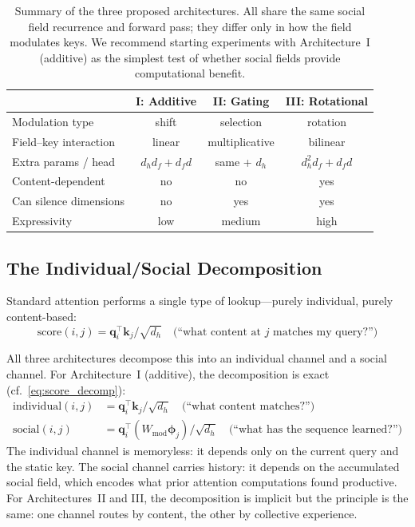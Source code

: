 \documentclass[11pt,a4paper]{article}
\newcommand{\field}{\bm{\phi}}
\newcommand{\q}{\bm{q}}
\newcommand{\K}{\bm{k}}
\begin{document}
\begin{table}[h]
\centering
\small
\begin{tabular}{@{}lccc@{}}
\toprule
& \textbf{I: Additive} & \textbf{II: Gating}
& \textbf{III: Rotational} \\
\midrule
Modulation type & shift & selection & rotation \\
Field--key interaction & linear & multiplicative & bilinear \\
Extra params / head & $d_h d_f + d_f d$ & same + $d_h$ &
$d_h^2 d_f + d_f d$ \\
Content-dependent & no & no & yes \\
Can silence dimensions & no & yes & yes \\
Expressivity & low & medium & high \\
\bottomrule
\end{tabular}
\caption{Summary of the three proposed architectures.  All share the
same social field recurrence and forward pass; they differ only in
how the field modulates keys.  We recommend starting experiments
with Architecture~I (additive) as the simplest test of whether
social fields provide computational benefit.}
\label{tab:architectures}
\end{table}

\subsection{The Individual/Social Decomposition}

Standard attention performs a single type of lookup---purely
individual, purely content-based:
\begin{equation}
    \text{score}(i, j) = \q_i^\top \K_j / \sqrt{d_h}
    \quad \text{(``what content at $j$ matches my query?'')}
\end{equation}

All three architectures decompose this into an individual channel
and a social channel.  For Architecture~I (additive), the
decomposition is exact (cf.~\cref{eq:score_decomp}):
\begin{align}
    \text{individual}(i, j) &= \q_i^\top \K_j / \sqrt{d_h}
    \quad \text{(``what content matches?'')}
    \label{eq:structured} \\
    \text{social}(i, j) &= \q_i^\top
    (W_{\text{mod}} \field_j) / \sqrt{d_h}
    \quad \text{(``what has the sequence learned?'')}
    \label{eq:social}
\end{align}
The individual channel is memoryless: it depends only on the current
query and the static key.  The social channel carries history: it
depends on the accumulated social field, which encodes what prior
attention computations found productive.  For Architectures~II and
III, the decomposition is implicit but the principle is the same:
one channel routes by content, the other by collective experience.
\end{document}
